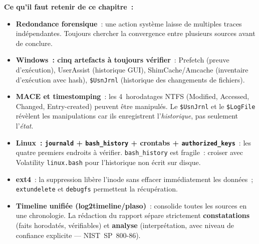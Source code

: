 \begin{boxresume}
\textbf{Ce qu'il faut retenir de ce chapitre~:}
\begin{itemize}
    \item \textbf{Redondance forensique}~: une action système laisse
          de multiples traces indépendantes. Toujours chercher la
          convergence entre plusieurs sources avant de conclure.

    \item \textbf{Windows~: cinq artefacts à toujours vérifier}~:
          Prefetch (preuve d'exécution), UserAssist (historique GUI),
          ShimCache/Amcache (inventaire d'exécution avec hash),
          \texttt{\$UsnJrnl} (historique des changements de fichiers).

    \item \textbf{MACE et timestomping}~: les 4~horodatages NTFS
          (Modified, Accessed, Changed, Entry-created) peuvent être
          manipulés. Le \texttt{\$UsnJrnl} et le \texttt{\$LogFile}
          révèlent les manipulations car ils enregistrent
          l'\emph{historique}, pas seulement l'\emph{état}.

    \item \textbf{Linux~: \texttt{journald} + \texttt{bash\_history}
          + crontabs + \texttt{authorized\_keys}}~: les quatre premiers
          endroits à vérifier. \texttt{bash\_history} est fragile~:
          croiser avec Volatility \texttt{linux.bash} pour l'historique
          non écrit sur disque.

    \item \textbf{ext4}~: la suppression libère l'inode sans effacer
          immédiatement les données~; \texttt{extundelete} et
          \texttt{debugfs} permettent la récupération.

    \item \textbf{Timeline unifiée (log2timeline/plaso)}~: consolide
          toutes les sources en une chronologie. La rédaction du
          rapport sépare strictement \textbf{constatations}
          (faits horodatés, vérifiables) et \textbf{analyse}
          (interprétation, avec niveau de confiance explicite ---
          NIST~SP~800-86).
\end{itemize}
\end{boxresume}

\bigskip

